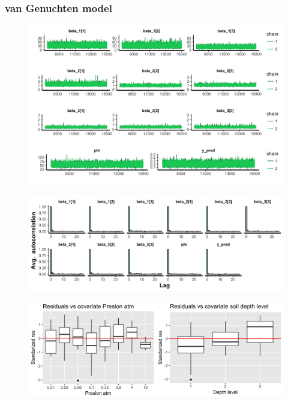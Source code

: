 \documentclass{article}
\begin{document}
\newpage
\subsubsection*{van Genuchten model}
\begin{figure}[ht!]
\centering
\includegraphics[width=16cm]{hier_3pars_trace.png}
\end{figure}

\begin{figure}[ht!]
\centering
\includegraphics[width=16cm]{hier_3pars_ac.png}
\end{figure}

\begin{figure}[ht!]
\centering
\includegraphics[width=13cm]{residuals.png}
\end{figure}
\end{document}
